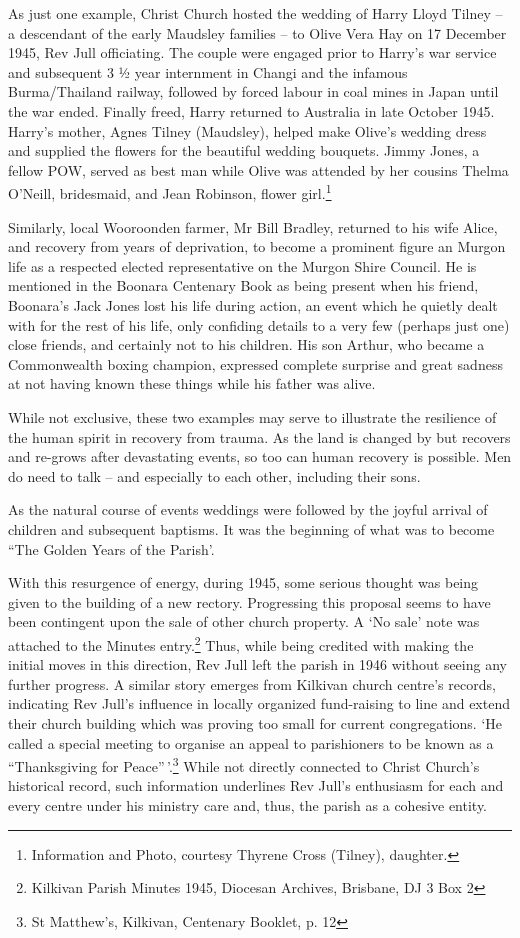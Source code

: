 As just one example, Christ Church hosted the wedding of Harry Lloyd Tilney -- a descendant of the early Maudsley families -- to Olive Vera Hay on 17 December 1945, Rev Jull officiating. The couple were engaged prior to Harry's war service and subsequent 3 ½ year internment in Changi and the infamous Burma/Thailand railway, followed by forced labour in coal mines in Japan until the war ended. Finally freed, Harry returned to Australia in late October 1945. Harry's mother, Agnes Tilney (Maudsley), helped make Olive's wedding dress and supplied the flowers for the beautiful wedding bouquets. Jimmy Jones, a fellow POW, served as best man while Olive was attended by her cousins Thelma O'Neill, bridesmaid, and Jean Robinson, flower girl.\footnote{Information and Photo, courtesy Thyrene Cross (Tilney), daughter.}

Similarly, local Wooroonden farmer, Mr Bill Bradley, returned to his wife Alice, and recovery from years of deprivation, to become a prominent figure an Murgon life as a respected elected representative on the Murgon Shire Council. He is mentioned in the Boonara Centenary Book as being present when his friend, Boonara's Jack Jones lost his life during action, an event which he quietly dealt with for the rest of his life, only confiding details to a very few (perhaps just one) close friends, and certainly not to his children. His son Arthur, who became a Commonwealth boxing champion, expressed complete surprise and great sadness at not having known these things while his father was alive.

While not exclusive, these two examples may serve to illustrate the resilience of the human spirit in recovery from trauma. As the land is changed by but recovers and re-grows after devastating events, so too can human recovery is possible. Men do need to talk -- and especially to each other, including their sons.

As the natural course of events weddings were followed by the joyful arrival of children and subsequent baptisms. It was the beginning of what was to become ``The Golden Years of the Parish'.

With this resurgence of energy, during 1945, some serious thought was being given to the building of a new rectory. Progressing this proposal seems to have been contingent upon the sale of other church property. A `No sale' note was attached to the Minutes entry.\footnote{Kilkivan Parish Minutes 1945, Diocesan Archives, Brisbane, DJ 3 Box 2} Thus, while being credited with making the initial moves in this direction, Rev Jull left the parish in 1946 without seeing any further progress. A similar story emerges from Kilkivan church centre's records, indicating Rev Jull's influence in locally organized fund-raising to line and extend their church building which was proving too small for current congregations. `He called a special meeting to organise an appeal to parishioners to be known as a ``Thanksgiving for Peace''\,'.\footnote{St Matthew's, Kilkivan, Centenary Booklet, p. 12} While not directly connected to Christ Church's historical record, such information underlines Rev Jull's enthusiasm for each and every centre under his ministry care and, thus, the parish as a cohesive entity.

